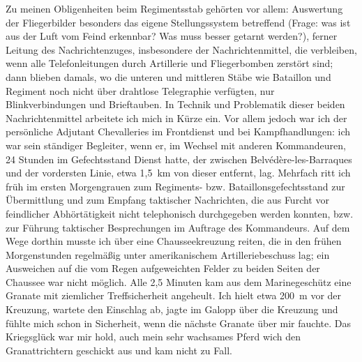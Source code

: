 Zu meinen Obligenheiten beim Regimentsstab gehörten vor allem: Auswertung der Fliegerbilder besonders das eigene Stellungssystem betreffend (Frage: was ist aus der Luft vom Feind erkennbar? Was muss besser getarnt werden?), ferner Leitung des Nachrichtenzuges, insbesondere der Nachrichtenmittel, die verbleiben, wenn alle Telefonleitungen durch Artillerie und Fliegerbomben zerstört sind; dann blieben damals, wo die unteren und mittleren Stäbe wie Bataillon und Regiment noch nicht über drahtlose Telegraphie verfügten, nur Blinkverbindungen und Brieftauben. In Technik und Problematik dieser beiden Nachrichtenmittel arbeitete ich mich in Kürze ein. Vor allem jedoch war ich der persönliche Adjutant Chevalleries im Frontdienst und bei Kampfhandlungen: ich war sein ständiger Begleiter, wenn er, im Wechsel mit anderen Kommandeuren, 24 Stunden im Gefechtsstand Dienst hatte, der zwischen Belvédère-les-Barraques und der vordersten Linie, etwa 1,5~km von dieser entfernt, lag. Mehrfach ritt ich früh im ersten Morgengrauen zum Regiments- bzw. Bataillonsgefechtsstand zur Übermittlung und zum Empfang taktischer Nachrichten, die aus Furcht vor feindlicher Abhörtätigkeit nicht telephonisch durchgegeben werden konnten, bzw. zur Führung taktischer Besprechungen im Auftrage des Kommandeurs. Auf dem Wege dorthin musste ich über eine Chausseekreuzung reiten, die in den frühen Morgenstunden regelmäßig unter amerikanischem Artilleriebeschuss lag; ein Ausweichen auf die vom Regen aufgeweichten Felder zu beiden Seiten der Chaussee war nicht möglich. Alle 2,5 Minuten kam aus dem Marinegeschütz eine Granate mit ziemlicher Treffsicherheit angeheult. Ich hielt etwa 200~m vor der Kreuzung, wartete den Einschlag ab, jagte im Galopp über die Kreuzung und fühlte mich schon in Sicherheit, wenn die nächste Granate über mir fauchte. Das Kriegsglück war mir hold, auch mein sehr wachsames Pferd wich den Granattrichtern geschickt aus und kam nicht zu Fall.

